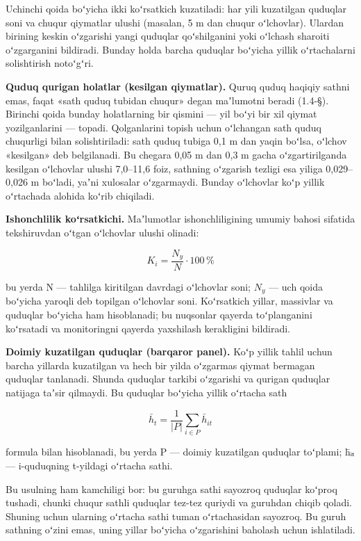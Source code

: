 \documentclass[14pt,a4paper,oneside]{extreport}
\begin{document}
Uchinchi qoida boʻyicha ikki koʻrsatkich kuzatiladi: har yili kuzatilgan
quduqlar soni va chuqur qiymatlar ulushi (masalan, 5 m dan chuqur
oʻlchovlar). Ulardan birining keskin oʻzgarishi yangi quduqlar
qoʻshilganini yoki oʻlchash sharoiti oʻzgarganini bildiradi. Bunday
holda barcha quduqlar boʻyicha yillik oʻrtachalarni solishtirish
notoʻgʻri.

\textbf{Quduq qurigan holatlar (kesilgan qiymatlar).} Quruq quduq
haqiqiy sathni emas, faqat «sath quduq tubidan chuqur» degan maʼlumotni
beradi (1.4-§). Birinchi qoida bunday holatlarning bir qismini --- yil
boʻyi bir xil qiymat yozilganlarini --- topadi. Qolganlarini topish
uchun oʻlchangan sath quduq chuqurligi bilan solishtiriladi: sath quduq
tubiga 0,1 m dan yaqin boʻlsa, oʻlchov «kesilgan» deb belgilanadi. Bu
chegara 0,05 m dan 0,3 m gacha oʻzgartirilganda kesilgan oʻlchovlar
ulushi 7,0--11,6 foiz, sathning oʻzgarish tezligi esa yiliga
0,029--0,026 m boʻladi, yaʼni xulosalar oʻzgarmaydi. Bunday oʻlchovlar
koʻp yillik oʻrtachada alohida koʻrib chiqiladi.

\textbf{Ishonchlilik koʻrsatkichi.} Maʼlumotlar ishonchliligining umumiy
bahosi sifatida tekshiruvdan oʻtgan oʻlchovlar ulushi olinadi:

\begin{equation}\tag{2.4}
K_i = \frac{N_y}{N} \cdot 100\,\%
\end{equation}

bu yerda N --- tahlilga kiritilgan davrdagi oʻlchovlar soni; \(N_{y}\)
--- uch qoida boʻyicha yaroqli deb topilgan oʻlchovlar soni. Koʻrsatkich
yillar, massivlar va quduqlar boʻyicha ham hisoblanadi; bu nuqsonlar
qayerda toʻplanganini koʻrsatadi va monitoringni qayerda yaxshilash
kerakligini bildiradi.

\textbf{Doimiy kuzatilgan quduqlar (barqaror panel).} Koʻp yillik tahlil
uchun barcha yillarda kuzatilgan va hech bir yilda oʻzgarmas qiymat
bermagan quduqlar tanlanadi. Shunda quduqlar tarkibi oʻzgarishi va
qurigan quduqlar natijaga taʼsir qilmaydi. Bu quduqlar boʻyicha yillik
oʻrtacha sath

\begin{equation}\tag{2.5}
\bar{h}_t = \frac{1}{|P|} \sum_{i \in P} \bar{h}_{it}
\end{equation}

formula bilan hisoblanadi, bu yerda P --- doimiy kuzatilgan quduqlar
toʻplami; h̄ᵢₜ --- i-quduqning t-yildagi oʻrtacha sathi.

Bu usulning ham kamchiligi bor: bu guruhga sathi sayozroq quduqlar
koʻproq tushadi, chunki chuqur sathli quduqlar tez-tez quriydi va
guruhdan chiqib qoladi. Shuning uchun ularning oʻrtacha sathi tuman
oʻrtachasidan sayozroq. Bu guruh sathning oʻzini emas, uning yillar
boʻyicha oʻzgarishini baholash uchun ishlatiladi.
\end{document}
